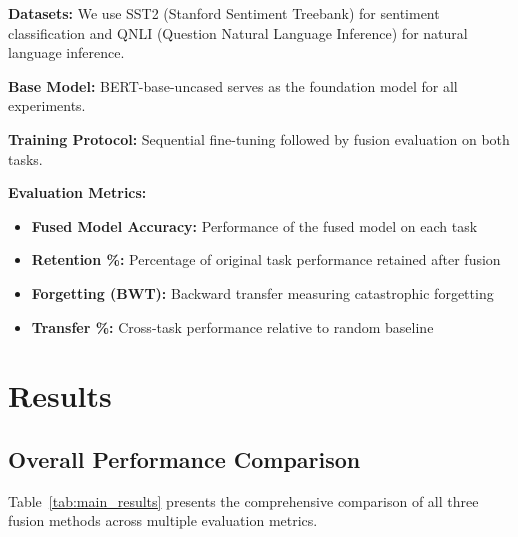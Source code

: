 \documentclass[11pt,a4paper]{article}
\begin{document}
\textbf{Datasets:} We use SST2 (Stanford Sentiment Treebank) for sentiment classification and QNLI (Question Natural Language Inference) for natural language inference.

\textbf{Base Model:} BERT-base-uncased serves as the foundation model for all experiments.

\textbf{Training Protocol:} Sequential fine-tuning followed by fusion evaluation on both tasks.

\textbf{Evaluation Metrics:}
\begin{itemize}
    \item \textbf{Fused Model Accuracy:} Performance of the fused model on each task
    \item \textbf{Retention \%:} Percentage of original task performance retained after fusion
    \item \textbf{Forgetting (BWT):} Backward transfer measuring catastrophic forgetting
    \item \textbf{Transfer \%:} Cross-task performance relative to random baseline
\end{itemize}

\section{Results}

\subsection{Overall Performance Comparison}

Table~\ref{tab:main_results} presents the comprehensive comparison of all three fusion methods across multiple evaluation metrics.
\end{document}
